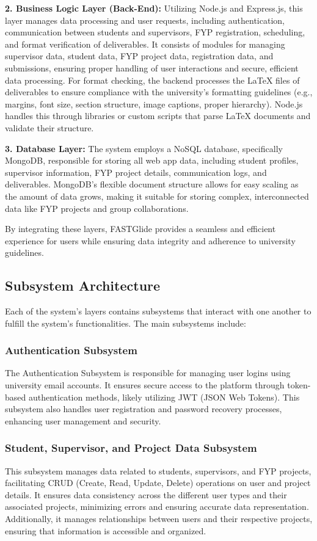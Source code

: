 \documentclass{FastFyp}
\begin{document}
\textbf{2. Business Logic Layer (Back-End):} Utilizing Node.js and Express.js, this layer manages data processing and user requests, including authentication, communication between students and supervisors, FYP registration, scheduling, and format verification of deliverables. It consists of modules for managing supervisor data, student data, FYP project data, registration data, and submissions, ensuring proper handling of user interactions and secure, efficient data processing. For format checking, the backend processes the LaTeX files of deliverables to ensure compliance with the university's formatting guidelines (e.g., margins, font size, section structure, image captions, proper hierarchy). Node.js handles this through libraries or custom scripts that parse LaTeX documents and validate their structure.

\textbf{3. Database Layer:} The system employs a NoSQL database, specifically MongoDB, responsible for storing all web app data, including student profiles, supervisor information, FYP project details, communication logs, and deliverables. MongoDB’s flexible document structure allows for easy scaling as the amount of data grows, making it suitable for storing complex, interconnected data like FYP projects and group collaborations.

By integrating these layers, FASTGlide provides a seamless and efficient experience for users while ensuring data integrity and adherence to university guidelines.


\subsection{Subsystem Architecture}
Each of the system’s layers contains subsystems that interact with one another to fulfill the system’s functionalities. The main subsystems include:

\subsubsection{Authentication Subsystem}
The Authentication Subsystem is responsible for managing user logins using university email accounts.
It ensures secure access to the platform through token-based authentication methods, likely utilizing JWT (JSON Web Tokens).
This subsystem also handles user registration and password recovery processes, enhancing user management and security.

\subsubsection{Student, Supervisor, and Project Data Subsystem}
This subsystem manages data related to students, supervisors, and FYP projects, facilitating CRUD (Create, Read, Update, Delete) operations on user and project details.
It ensures data consistency across the different user types and their associated projects, minimizing errors and ensuring accurate data representation.
Additionally, it manages relationships between users and their respective projects, ensuring that information is accessible and organized.
\end{document}
